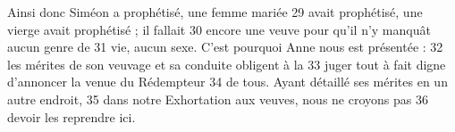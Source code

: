Ainsi donc Siméon a prophétisé, une femme mariée	 
29	 	avait prophétisé, une vierge avait prophétisé ; il fallait	 
30	 	encore une veuve pour qu'il n'y manquât aucun genre de	 
31	 	vie, aucun sexe. C'est pourquoi Anne nous est présentée :	 
32	 	les mérites de son veuvage et sa conduite obligent à la	 
33	 	juger tout à fait digne d'annoncer la venue du Rédempteur	 
34	 	de tous. Ayant détaillé ses mérites en un autre endroit,	 
35	 	dans notre Exhortation aux veuves, nous ne croyons pas	 
36	 	devoir les reprendre ici.